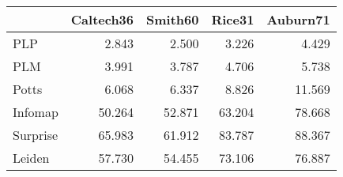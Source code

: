 \begin{tabular}{lrrrr}
\toprule
{} & Caltech36 & Smith60 & Rice31 & Auburn71 \\
\midrule
PLP      &     2.843 &   2.500 &  3.226 &    4.429 \\
PLM      &     3.991 &   3.787 &  4.706 &    5.738 \\
Potts    &     6.068 &   6.337 &  8.826 &   11.569 \\
Infomap  &    50.264 &  52.871 & 63.204 &   78.668 \\
Surprise &    65.983 &  61.912 & 83.787 &   88.367 \\
Leiden   &    57.730 &  54.455 & 73.106 &   76.887 \\
\bottomrule
\end{tabular}
